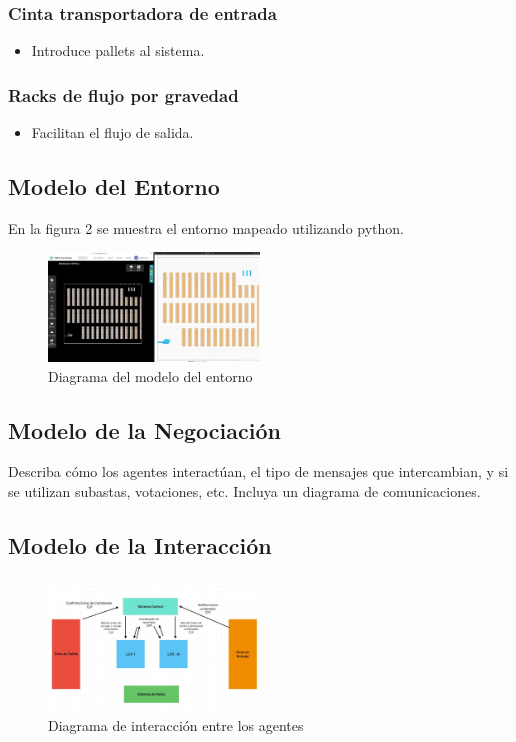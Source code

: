 \documentclass[sjournal]{IEEEtran}
\begin{document}
\subsubsection*{Cinta transportadora de entrada}
\begin{itemize}
    \item Introduce pallets al sistema.
\end{itemize}

\subsubsection*{Racks de flujo por gravedad}
\begin{itemize}
    \item Facilitan el flujo de salida.
\end{itemize}

\subsection{Modelo del Entorno}
En la figura 2 se muestra el entorno mapeado utilizando python.
\begin{figure}[h!]
    \centering
    \includegraphics[width=0.5\textwidth]{modeloEntorno.jpeg}
    \caption{Diagrama del modelo del entorno}
    \label{fig:modeloEntorno}
\end{figure}

\subsection{Modelo de la Negociación}
Describa cómo los agentes interactúan, el tipo de mensajes que intercambian, y si se utilizan subastas, votaciones, etc. Incluya un diagrama de comunicaciones.

\subsection{Modelo de la Interacción}
\begin{figure}[h!]
    \centering
    \includegraphics[width=0.5\textwidth]{modeloInteraccion.jpeg}
    \caption{Diagrama de interacción entre los agentes}
    \label{fig:modeloInteraccion}
\end{figure}
\end{document}
